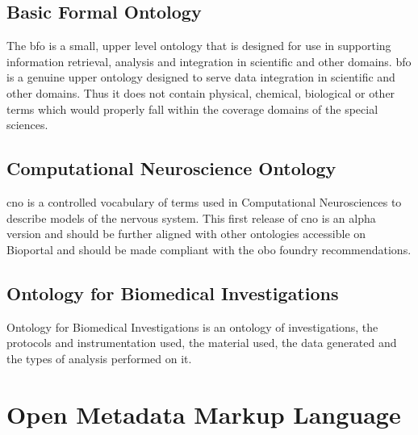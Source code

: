 \subsection{Basic Formal Ontology}
The \gls{bfo} is a small, upper level ontology that is designed for use in supporting information retrieval, analysis and integration in scientific and other domains. \gls{bfo} is a genuine upper ontology designed to serve data integration in scientific and other domains. Thus it does not contain physical, chemical, biological or other terms which would properly fall within the coverage domains of the special sciences.  \cite{bfo}
\subsection{Computational Neuroscience Ontology}
\gls{cno} is a controlled vocabulary of terms used in Computational Neurosciences to describe models of the nervous system. This first release of \gls{cno} is an alpha version and should be further aligned with other ontologies accessible on Bioportal and should be made compliant with the \gls{obo} foundry recommendations. \cite{cno}
\subsection{Ontology for Biomedical Investigations}
Ontology for Biomedical Investigations is an ontology of investigations, the protocols and instrumentation used, the material used, the data generated and the types of analysis performed on it. \cite{obi}


\section{Open Metadata Markup Language}

